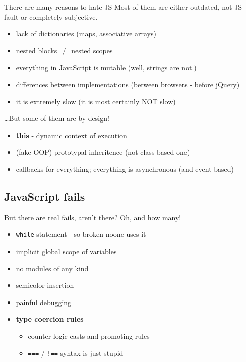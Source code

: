 \documentclass[xcolor=dvipsnames]{beamer}
\newcommand{\slide}[1]{\begin{frame}[fragile]{{#1}}}
\newcommand{\epic}[1]{\textbf{\huge{{#1}}}}
\begin{document}
\slide{There are many reasons to hate JS}
    Most of them are either outdated, not JS fault or completely subjective. \\ %
    
    \pause

    \begin{itemize}
        \item lack of dictionaries (maps, associative arrays)
        \item nested blocks $\not=$ nested scopes   %
        \item everything in JavaScript is mutable (well, strings are not.)
        \item differences between implementations (between browsers - before jQuery)
        \item it is extremely slow (it is most certainly NOT slow)
    \end{itemize}
\end{frame}


\slide{\ldots But some of them are by design!}

    \begin{itemize}
        \item \textbf{this} - dynamic context of execution
        \item (fake OOP) prototypal inheritence (not class-based one)
        \item callbacks for everything; everything is asynchronous (and event based)
    \end{itemize}
\end{frame}


\subsection{JavaScript fails}
\slide{But there are real fails, aren't there?}
    Oh, and how many! \\

    \begin{itemize}
        \item \verb+while+ statement - so broken noone uses it
        \item implicit global scope of variables
        \item no modules of any kind
        \item semicolor insertion
        \item painful debugging
        \pause
        \item \epic{type coercion rules}
            \begin{itemize}
                \item counter-logic casts and promoting rules
                \item \verb+===+ / \verb+!==+ syntax is just stupid
            \end{itemize}
    \end{itemize}
\end{frame}
\end{document}
